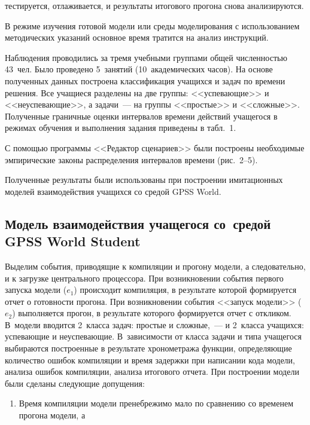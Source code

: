 \begin{multicols}{2}

\noindent
 тестируется, отлаживается, и результаты 
итогового прогона снова анализируются. 
  
  В режиме изучения готовой модели или среды моделирования с 
использованием методических указаний основное время тратится на анализ 
инструкций.


  
  Наблюдения проводились за тремя учебными группами общей численностью 
43~чел. Было проведено 5~занятий (10~академических часов). На основе 
полученных данных построена классификация учащихся и задач по времени 
решения. Все учащиеся разделены на две группы: <<успевающие>> и 
<<неуспевающие>>, а задачи~--- на группы <<простые>> и <<сложные>>. 
Полученные граничные оценки интервалов времени действий учащегося в 
режимах обучения и выполнения задания приведены в табл.~1. 
  
  С помощью программы <<Редактор сценариев>> были построены 
необходимые эмпирические законы распределения интервалов времени 
  (рис.~2--5).


  Полученные результаты были использованы при построении имитационных 
моделей взаимодействия учащихся со средой GPSS World.
  
\subsection{Модель взаимодействия учащегося со~средой GPSS World 
Student}

\vspace*{6pt}
  
  Выделим события, приводящие к компиляции и прогону модели, а 
следовательно, и к загрузке центрального процессора. При возникновении 
события первого запуска модели ($e_1$) происходит компиляция, в результате 
которой формируется отчет о готовности прогона. При возникновении события 
<<запуск модели>> ($e_2$) выполняется прогон, в результате которого 
формируется отчет с откликом. В~модели вводится 2~класса задач: простые и 
сложные,~--- и 2~класса учащихся: успевающие и неуспевающие. В~зависимости 
от класса задачи и типа учащегося выбираются построенные в результате 
хронометража функции, определяющие количество ошибок компиляции и время 
задержки при написании кода модели, анализа ошибок компиляции, анализа 
итогового отчета. При построении модели были сделаны следующие допущения:

\noindent
  \begin{enumerate}[1.]
\item Время компиляции модели пренебрежимо мало по сравнению со 
временем прогона модели, а\linebreak
\end{enumerate}



\end{multicols}

